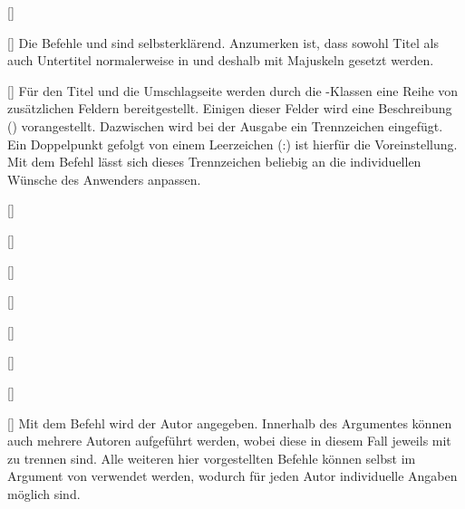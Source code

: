 \begin{Declaration*}{}
\begin{Declaration*}{}
\begin{Declaration*}{}
\begin{Declaration}{[]}
\begin{Declaration}{[]}
\printdeclarationlist%
%
%
Die Befehle  und  sind selbsterklärend. Anzumerken 
ist, dass sowohl Titel als auch Untertitel normalerweise in \DIN und deshalb 
mit Majuskeln gesetzt werden. 
\end{Declaration}
\end{Declaration}

\begin{Declaration}{[]}
\printdeclarationlist%
%
%
Für den Titel und die Umschlagseite werden durch die \TUDScript-Klassen eine 
Reihe von zusätzlichen Feldern bereitgestellt. Einigen dieser Felder wird eine 
Beschreibung () vorangestellt. Dazwischen 
wird bei der Ausgabe ein Trennzeichen eingefügt. Ein Doppelpunkt gefolgt von 
einem Leerzeichen (:) ist hierfür die Voreinstellung. Mit 
dem Befehl  lässt sich dieses Trennzeichen beliebig an 
die individuellen Wünsche des Anwenders anpassen.
\end{Declaration}

\begin{Declaration}{[]}
\begin{Declaration}{[]}
\begin{Declaration}{[]}
\begin{Declaration}{[]}
\begin{Declaration}{[]}
\begin{Declaration}{[]}
\begin{Declaration}{[]}
\begin{Declaration}{[]}
\printdeclarationlist%
%
%
%
%
Mit dem Befehl  wird der Autor angegeben. Innerhalb des 
Argumentes können auch mehrere Autoren aufgeführt werden, wobei diese in diesem 
Fall jeweils mit  zu trennen sind. Alle weiteren hier vorgestellten 
Befehle können selbst im Argument von  verwendet werden, wodurch 
für jeden Autor individuelle Angaben möglich sind.


\end{Declaration}
\end{Declaration}
\end{Declaration}
\end{Declaration}
\end{Declaration}
\end{Declaration}
\end{Declaration}
\end{Declaration}
\end{Declaration*}
\end{Declaration*}
\end{Declaration*}
